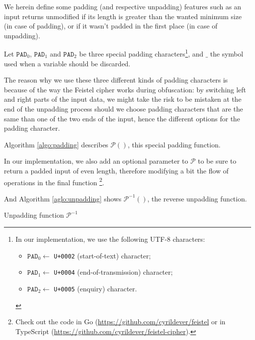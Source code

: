 \documentclass[twoside,twocolumn]{article}
\theoremstyle{definition}
\theoremstyle{remark}
\begin{document}
We herein define some padding (and respective unpadding) features such as an input returns unmodified if its length is greater than the wanted minimum 
size (in case of padding), or if it wasn't padded in the first place (in case of unpadding).

Let $\texttt{PAD}_0$, $\texttt{PAD}_1$ and $\texttt{PAD}_2$ be three special padding characters\footnote{In our implementation, we use the following 
UTF-8 characters:
\begin{itemize}
    \item $\texttt{PAD}_0 \gets$ \texttt{U+0002} (start-of-text) character;
    \item $\texttt{PAD}_1 \gets$ \texttt{U+0004} (end-of-transmission) character;
    \item $\texttt{PAD}_2 \gets$ \texttt{U+0005} (enquiry) character.
\end{itemize}}, and $\_$ the symbol used when a variable should be discarded.

The reason why we use these three different kinds of padding characters is because of the way the Feistel cipher works during obfuscation: by switching 
left and right parts of the input data, we might take the risk to be mistaken at the end of the unpadding process should we choose padding characters 
that are the same than one of the two ends of the input, hence the different options for the padding character.

Algorithm \ref{algo:padding} describes $\mathcal{P}()$, this special padding function.

In our implementation, we also add an optional parameter to $\mathcal{P}$ to be sure to return a padded input of even length, therefore modifying a bit 
the flow of operations in the final function \footnote{Check out the code in Go (\url{https://github.com/cyrildever/feistel} or in TypeScript  
(\url{https://github.com/cyrildever/feistel-cipher}).}.

And Algorithm \ref{aglo:unpadding} shows $\mathcal{P}^{-1}()$, the reverse unpadding function.

\begin{algorithm}
    \caption{Unpadding function $\mathcal{P}^{-1}$}
    \label{aglo:unpadding}
\end{algorithm}
\end{document}
